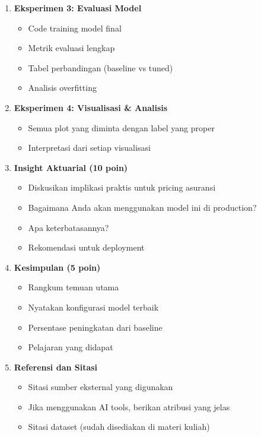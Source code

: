 \documentclass[12pt,a4paper]{article}
\begin{document}
\begin{enumerate}[label=\textbf{\arabic*.}]
    \item \textbf{Eksperimen 3: Evaluasi Model}
    \begin{itemize}
        \item Code training model final
        \item Metrik evaluasi lengkap
        \item Tabel perbandingan (baseline vs tuned)
        \item Analisis overfitting
    \end{itemize}
    
    \item \textbf{Eksperimen 4: Visualisasi \& Analisis}
    \begin{itemize}
        \item Semua plot yang diminta dengan label yang proper
        \item Interpretasi dari setiap visualisasi
    \end{itemize}
    
    \item \textbf{Insight Aktuarial (10 poin)}
    \begin{itemize}
        \item Diskusikan implikasi praktis untuk pricing asuransi
        \item Bagaimana Anda akan menggunakan model ini di production?
        \item Apa keterbatasannya?
        \item Rekomendasi untuk deployment
    \end{itemize}
    
    \item \textbf{Kesimpulan (5 poin)}
    \begin{itemize}
        \item Rangkum temuan utama
        \item Nyatakan konfigurasi model terbaik
        \item Persentase peningkatan dari baseline
        \item Pelajaran yang didapat
    \end{itemize}
    
    \item \textbf{Referensi dan Sitasi}
    \begin{itemize}
        \item Sitasi sumber eksternal yang digunakan
        \item Jika menggunakan AI tools, berikan atribusi yang jelas
        \item Sitasi dataset (sudah disediakan di materi kuliah)
    \end{itemize}
\end{enumerate}
\end{document}
